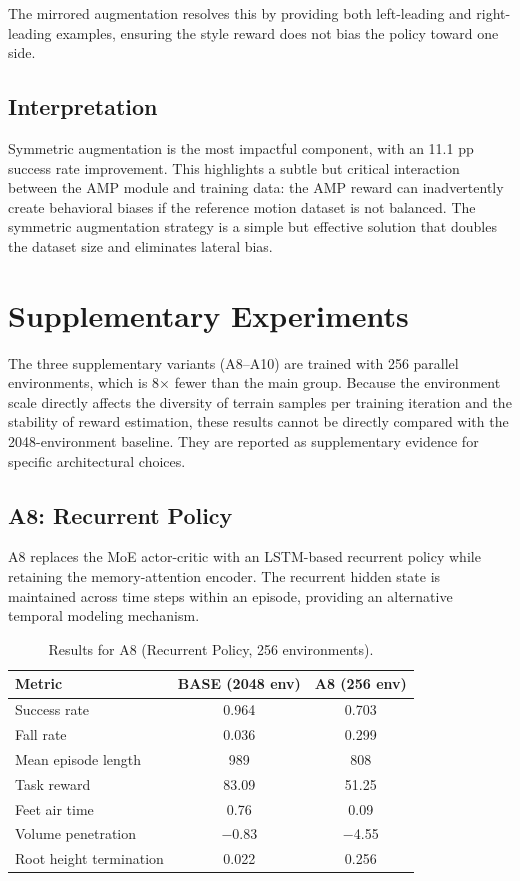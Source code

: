 The mirrored augmentation resolves this by providing both left-leading and right-leading examples, ensuring the style reward does not bias the policy toward one side.

\subsection{Interpretation}

Symmetric augmentation is the most impactful component, with an 11.1 pp success rate improvement. This highlights a subtle but critical interaction between the AMP module and training data: the AMP reward can inadvertently create behavioral biases if the reference motion dataset is not balanced. The symmetric augmentation strategy is a simple but effective solution that doubles the dataset size and eliminates lateral bias.

\section{Supplementary Experiments}
\label{sec:supplementary_experiments}

The three supplementary variants (A8--A10) are trained with 256 parallel environments, which is 8$\times$ fewer than the main group. Because the environment scale directly affects the diversity of terrain samples per training iteration and the stability of reward estimation, these results cannot be directly compared with the 2048-environment baseline. They are reported as supplementary evidence for specific architectural choices.

\subsection{A8: Recurrent Policy}

A8 replaces the MoE actor-critic with an LSTM-based recurrent policy while retaining the memory-attention encoder. The recurrent hidden state is maintained across time steps within an episode, providing an alternative temporal modeling mechanism.

\begin{table}[t]
\centering
\caption{Results for A8 (Recurrent Policy, 256 environments).}
\label{tab:a8_results}
\begin{tabular}{lcc}
\toprule
\textbf{Metric} & \textbf{BASE (2048 env)} & \textbf{A8 (256 env)} \\
\midrule
Success rate & 0.964 & 0.703 \\
Fall rate & 0.036 & 0.299 \\
Mean episode length & 989 & 808 \\
Task reward & 83.09 & 51.25 \\
Feet air time & 0.76 & 0.09 \\
Volume penetration & $-$0.83 & $-$4.55 \\
Root height termination & 0.022 & 0.256 \\
\bottomrule
\end{tabular}
\end{table}

